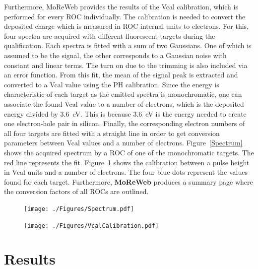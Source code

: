 \documentclass[a4paper,12pt,twoside]{article}
\begin{document}
Furthermore, MoReWeb provides the results of the Vcal calibration, which is performed for every ROC individually. The calibration is needed to convert the deposited charge which is measured in ROC internal units to electrons. For this, four spectra are acquired with different fluorescent targets during the qualification. Each spectra is fitted with a sum of two Gaussians. One of which is assumed to be the signal, the other corresponds to a Gaussian noise with constant and linear terms. The turn on due to the trimming is also included via an error function. From this fit, the mean of the signal peak is extracted and converted to a Vcal value using the PH calibration. Since the energy is characteristic of each target as the emitted spectra is monochromatic, one can associate the found Vcal value to a number of electrons, which is the deposited energy divided by \SI{3.6}{\electronvolt}. This is because \SI{3.6}{\electronvolt} is the energy needed to create one electron-hole pair in silicon. Finally, the corresponding electron numbers of all four targets are fitted with a straight line in order to get conversion parameters between Vcal values and a number of electrons. Figure~\ref{Spectrum} shows the acquired spectrum by a ROC of one of the monochromatic targets. The red line represents the fit. Figure~\ref{VcalCalibration} shows the calibration between a pulse height in Vcal units and a number of electrons. The four blue dots represent the values found for each target. Furthermore, \textbf{MoReWeb} produces a summary page where the conversion factors of all ROCs are outlined. 

\begin{figure} [h!]
\centering
\begin{minipage}{.48\textwidth}
  \centering
  \texttt{[image: ./Figures/Spectrum.pdf]}
  \label{Spectrum}
\end{minipage}%
\hspace{2mm}
\begin{minipage}{.48\textwidth}
  \centering
  \texttt{[image: ./Figures/VcalCalibration.pdf]}
  \label{VcalCalibration}
\end{minipage}
\end{figure}

\section{Results}
\end{document}
